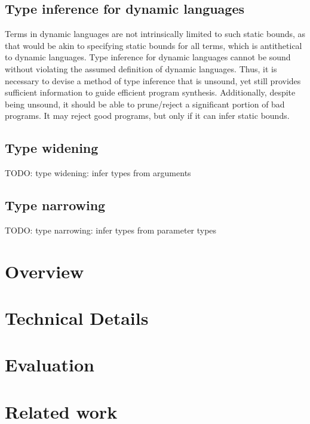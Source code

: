 \documentclass[]{acmart}
\begin{document}
\subsection*{Type inference for dynamic languages}
Terms in dynamic languages are not intrinsically limited to such static bounds, as that would be akin
to specifying static bounds for all terms, which is antithetical to dynamic languages. 
Type inference for dynamic languages cannot be sound without violating 
the assumed definition of dynamic languages. 
Thus, it is necessary to devise a method of type inference that is unsound, yet still provides   
sufficient information to guide efficient program synthesis.
Additionally, despite being unsound, it should be able to prune/reject 
a significant portion of bad programs. 
It may reject good programs, but only if it can infer static bounds.

\subsection*{Type widening}
TODO: type widening: infer types from arguments

\subsection*{Type narrowing}
TODO: type narrowing: infer types from parameter types




\section{Overview}

\section{Technical Details}

\section{Evaluation}

\section{Related work}





\end{document}
